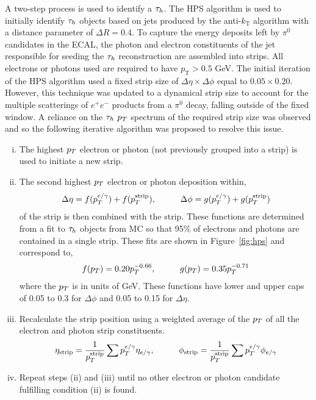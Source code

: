 A two-step process is used to identify a $\tau_{h}$.
The \ac{HPS} algorithm is used to initially identify $\tau_{h}$ objects based on jets produced by the anti-$k_{\text{T}}$ algorithm with a distance parameter of $\Delta R = 0.4$. 
To capture the energy deposits left by $\pi^0$ candidates in the \ac{ECAL}, the photon and electron constituents of the jet responsible for seeding the $\tau_{h}$ reconstruction are assembled into strips. 
All electrons or photons used are required to have $p_{\text{T}} > 0.5$ GeV.
The initial iteration of the \ac{HPS} algorithm used a fixed strip size of $\Delta \eta \times \Delta \phi$ equal to $0.05 \times 0.20$.
However, this technique was updated to a dynamical strip size to account for the multiple scatterings of $e^+ e^-$ products from a $\pi^0$ decay, falling outside of the fixed window.
A reliance on the $\tau_{h}$ $p_{T}$ spectrum of the required strip size was observed and so the following iterative algorithm was proposed to resolve this issue.

\begin{enumerate}[i)]
\item The highest $p_{T}$ electron or photon (not previously grouped into a strip) is used to initiate a new strip.
\item The second highest $p_{T}$ electron or photon deposition within,
\begin{equation}
  \Delta \eta = f(p_{T}^{e/\gamma}) + f(p_{T}^{\text{strip}}), \hspace{1cm} \Delta \phi = g(p_{T}^{e/\gamma}) + g(p_{T}^{\text{strip}})
\end{equation}
of the strip is then combined with the strip.
These functions are determined from a fit to $\tau_{h}$ objects from \ac{MC} so that 95\% of electrons and photons are contained in a single strip.
These fits are shown in Figure~\ref{fig:hps} and correspond to,
\begin{equation}
f(p_{T}) = 0.20 p_{T}^{-0.66}, \hspace{1cm} g(p_{T}) = 0.35 p_{T}^{-0.71}
\end{equation}
where the $p_{T}$ is in units of GeV.
These functions have lower and upper caps of 0.05 to 0.3 for $\Delta\phi$ and 0.05 to 0.15 for $\Delta\eta$.
\item Recalculate the strip position using a weighted average of the $p_{T}$ of all the electron and photon strip constituents.
\begin{equation}
\eta_{\text{strip}} = \frac{1}{p_{T}^{\text{strip}}} \sum p_{T}^{e/\gamma} \eta_{e/\gamma}, \hspace{1cm} \phi_{\text{strip}} = \frac{1}{p_{T}^{\text{strip}}} \sum p_{T}^{e/\gamma} \phi_{e/\gamma}
\end{equation}
\item Repeat steps (ii) and (iii) until no other electron or photon candidate fulfilling condition (ii) is found.
\end{enumerate}

